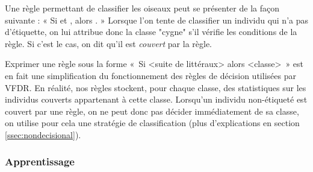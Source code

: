             Une règle permettant de classifier les oiseaux peut se présenter de la façon suivante : « Si  et , alors . » Lorsque l'on tente de classifier un individu qui n'a pas d'étiquette, on lui attribue donc la classe "cygne" s'il vérifie les conditions de la règle. Si c'est le cas, on dit qu'il est \emph{couvert} par la règle.

            Exprimer une règle sous la forme «~Si <suite de littéraux> alors <classe>~» est en fait une simplification du fonctionnement des règles de décision utilisées par VFDR. En réalité, nos règles stockent, pour chaque classe, des statistiques sur les individus couverts appartenant à cette classe. Lorsqu’un individu non-étiqueté est couvert par une règle, on ne peut donc pas décider immédiatement de sa classe, on utilise pour cela une stratégie de classification (plus d'explications en section \ref{ssec:nondecisional}).


        \subsubsection{Apprentissage}\label{ssec:apprentissage}

